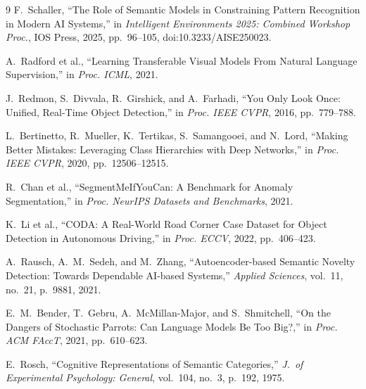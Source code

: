\documentclass[conference]{IEEEtran}
\begin{document}
\begin{thebibliography}{9}
F.~Schaller, ``The Role of Semantic Models in Constraining Pattern Recognition in
Modern AI Systems,'' in \emph{Intelligent Environments 2025: Combined Workshop
Proc.}, IOS Press, 2025, pp.~96--105, doi:10.3233/AISE250023.

A.~Radford et al., ``Learning Transferable Visual Models From Natural Language
Supervision,'' in \emph{Proc. ICML}, 2021.

J.~Redmon, S.~Divvala, R.~Girshick, and A.~Farhadi, ``You Only Look Once:
Unified, Real-Time Object Detection,'' in \emph{Proc. IEEE CVPR}, 2016,
pp.~779--788.

L.~Bertinetto, R.~Mueller, K.~Tertikas, S.~Samangooei, and N.~Lord, ``Making
Better Mistakes: Leveraging Class Hierarchies with Deep Networks,'' in
\emph{Proc. IEEE CVPR}, 2020, pp.~12506--12515.

R.~Chan et al., ``SegmentMeIfYouCan: A Benchmark for Anomaly Segmentation,'' in
\emph{Proc. NeurIPS Datasets and Benchmarks}, 2021.

K.~Li et al., ``CODA: A Real-World Road Corner Case Dataset for Object Detection
in Autonomous Driving,'' in \emph{Proc. ECCV}, 2022, pp.~406--423.

A.~Rausch, A.~M.~Sedeh, and M.~Zhang, ``Autoencoder-based Semantic Novelty
Detection: Towards Dependable AI-based Systems,'' \emph{Applied Sciences},
vol.~11, no.~21, p.~9881, 2021.

E.~M.~Bender, T.~Gebru, A.~McMillan-Major, and S.~Shmitchell, ``On the Dangers of
Stochastic Parrots: Can Language Models Be Too Big?,'' in \emph{Proc. ACM FAccT},
2021, pp.~610--623.

E.~Rosch, ``Cognitive Representations of Semantic Categories,'' \emph{J.\ of
Experimental Psychology: General}, vol.~104, no.~3, p.~192, 1975.
\end{thebibliography}
\end{document}
